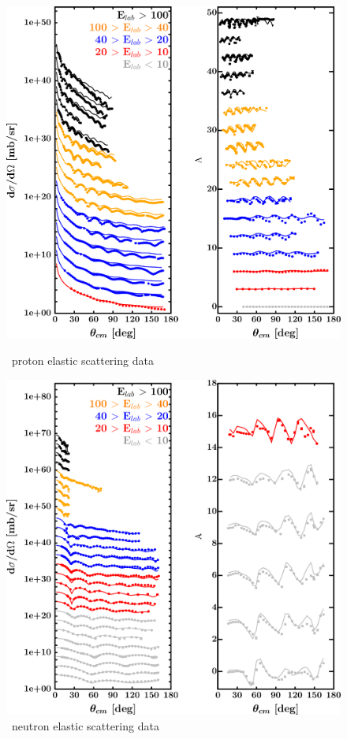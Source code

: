 \label{pb208DOMOutput}
\begin{figure}[H]
    \centering
    \begin{minipage}{0.45\textwidth}
        \centering
        \includegraphics[width=1.0\textwidth]{figures/pb208_protonElastic.png}
        \caption{\pbEight\ proton elastic scattering data}
        \label{DOMFitData_pb208_proton_elastic}
    \end{minipage}\hfill
    \begin{minipage}{0.45\textwidth}
        \centering
        \includegraphics[width=1.0\textwidth]{figures/pb208_neutronElastic.png}
        \caption{\pbEight\ neutron elastic scattering data}
        \label{DOMFitData_pb208_neutron_elastic}
    \end{minipage}
\end{figure}

